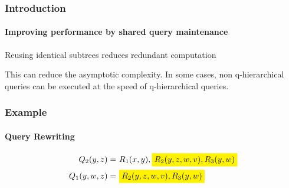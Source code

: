 \documentclass[
	11pt, %
]{beamer}
\begin{document}
\begin{frame}
	\frametitle{Introduction}
	\framesubtitle{Improving performance by shared query maintenance}
	Reusing identical subtrees reduces redundant computation
	
	This can reduce the asymptotic complexity. In some cases, non q-hierarchical queries can be executed at the speed of q-hierarchical queries.\\
	\vspace{1cm}
	\begin{minipage}{0.49\textwidth}
		\centering
	\end{minipage}
	\begin{minipage}{0.49\textwidth}
				\centering
	\end{minipage}
\end{frame}


\begin{frame}
	\frametitle{Example}
	\framesubtitle{Query Rewriting}
		\begin{align*}
			Q_2(y,z) =&\ R_1(x, y), \colorbox{yellow}{\mbox{$R_2(y,z,w,v), R_3(y,w)$}}\\
			Q_1(y,w,z) =&\  \colorbox{yellow}{\mbox{$R_2(y,z,w,v), R_3(y,w)$}}\\
		\end{align*}

\end{frame}

%	
\end{document}
